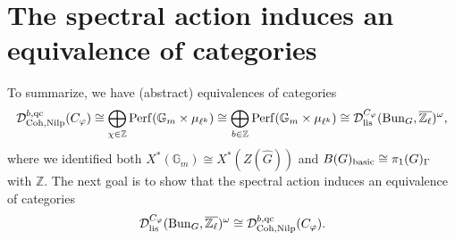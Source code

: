 \section{The spectral action induces an equivalence of categories}
To summarize, we have (abstract) equivalences of categories
$$\mathcal{D}^{b, \operatorname{\operatorname{qc}}}_{\operatorname{\operatorname{Coh}}, \operatorname{\operatorname{Nilp}}}(C_{\varphi}) \cong \bigoplus_{\chi \in \mathbb{Z}}\operatorname{\operatorname{Perf}}(\mathbb{G}_m \times \mu_{\ell^k}) \cong \bigoplus_{b \in \mathbb{Z}}\operatorname{\operatorname{Perf}}(\mathbb{G}_m \times \mu_{\ell^k}) \cong \mathcal{D}^{C_{\varphi}}_{\operatorname{\operatorname{lis}}}(\operatorname{\operatorname{Bun}}_G, \overline{\mathbb{Z}_{\ell}})^{\omega},$$
where we identified both $X^*(\mathbb{G}_m) \cong X^*(Z(\hat{G}))$ and $B(G)_{\operatorname{\operatorname{basic}}} \cong \pi_1(G)_{\Gamma}$ with $\mathbb{Z}$. The next goal is to show that the spectral action induces an equivalence of categories
\begin{equation}\label{Equiv}
	\mathcal{D}_{\operatorname{\operatorname{lis}}}^{C_{\varphi}}(\operatorname{\operatorname{Bun}}_G, \overline{\mathbb{Z}_{\ell}})^{\omega} \cong \mathcal{D}^{b, \operatorname{\operatorname{qc}}}_{\operatorname{\operatorname{Coh}}, \operatorname{\operatorname{Nilp}}}(C_{\varphi}).
\end{equation}

%

%
%
%

